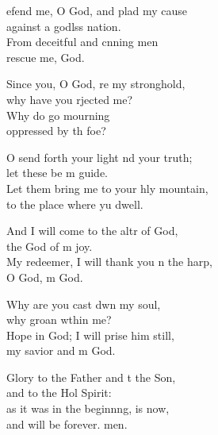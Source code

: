 \settowidth{\versewidth}{My redeemer, I will thank you on the harp, *}
\begin{psalmverse}%
  \begin{patverse}
    efend me, O God, and plad my cause\Med\\
against a godlss nation.\\
From deceitful and cnning men\Med\\
rescue me,  God.

Since you, O God, re my stronghold,\Med\\
why have you rjected me?\\
Why do  go mourning\Med\\
oppressed by th foe?

O send forth your light nd your truth;\Med\\
let these be m guide.\\
Let them bring me to your hly mountain,\Med\\
to the place where yu dwell.

And I will come to the altr of God,\Med\\
the God of m joy.\\
My redeemer, I will thank you n the harp,\Med\\
O God, m God.

Why are you cast dwn my soul,\Med\\
why groan w\pointup{\i}thin me?\\
Hope in God; I will prise him still,\Med\\
my savior and m God.

Glory to the Father and t the Son,\Med\\
and to the Hol Spirit:\\
as it was in the beginn\pointup{\i}ng, is now,\Med\\
and will be forever. men.
  \end{patverse}
\end{psalmverse}
